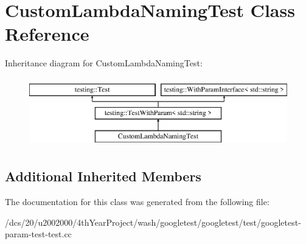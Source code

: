 \hypertarget{classCustomLambdaNamingTest}{}\section{Custom\+Lambda\+Naming\+Test Class Reference}
\label{classCustomLambdaNamingTest}
Inheritance diagram for Custom\+Lambda\+Naming\+Test\+:\begin{figure}[H]
\begin{center}
\leavevmode
\includegraphics[height=3.000000cm]{classCustomLambdaNamingTest}
\end{center}
\end{figure}
\subsection*{Additional Inherited Members}


The documentation for this class was generated from the following file\+:\begin{DoxyCompactItemize}
\item 
/dcs/20/u2002000/4th\+Year\+Project/wash/googletest/googletest/test/googletest-\/param-\/test-\/test.\+cc\end{DoxyCompactItemize}
